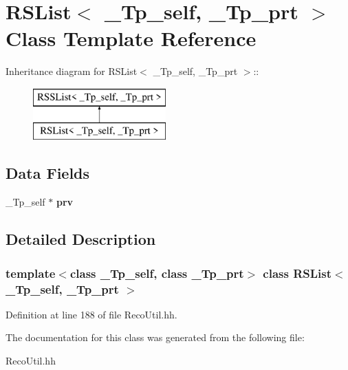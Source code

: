 \section{RSList$<$ \_\-Tp\_\-self, \_\-Tp\_\-prt $>$ Class Template Reference}
\label{classRSList}
Inheritance diagram for RSList$<$ \_\-Tp\_\-self, \_\-Tp\_\-prt $>$::\begin{figure}[H]
\begin{center}
\leavevmode
\includegraphics[height=2cm]{classRSList}
\end{center}
\end{figure}
\subsection*{Data Fields}
\begin{DoxyCompactItemize}
\item 
\_\-Tp\_\-self $\ast$ {\bfseries prv}\label{classRSList_acb26209a58ad251d0c451985f6f612dd}

\end{DoxyCompactItemize}


\subsection{Detailed Description}
\subsubsection*{template$<$class \_\-Tp\_\-self, class \_\-Tp\_\-prt$>$ class RSList$<$ \_\-Tp\_\-self, \_\-Tp\_\-prt $>$}



Definition at line 188 of file RecoUtil.hh.

The documentation for this class was generated from the following file:\begin{DoxyCompactItemize}
\item 
RecoUtil.hh\end{DoxyCompactItemize}
